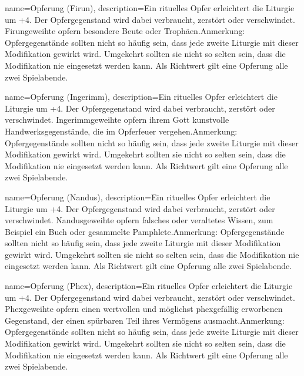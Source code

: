 {
    name={Opferung (Firun)},
    description={Ein rituelles Opfer erleichtert die Liturgie um +4. Der Opfergegenstand wird dabei verbraucht, zerstört oder verschwindet. Firungeweihte opfern besondere Beute oder Trophäen.\newline Anmerkung: Opfergegenstände sollten nicht so häufig sein, dass jede zweite Liturgie mit dieser Modifikation gewirkt wird. Umgekehrt sollten sie nicht so selten sein, dass die Modifikation nie eingesetzt werden kann. Als Richtwert gilt eine Opferung alle zwei Spielabende.}
}


{
    name={Opferung (Ingerimm)},
    description={Ein rituelles Opfer erleichtert die Liturgie um +4. Der Opfergegenstand wird dabei verbraucht, zerstört oder verschwindet. Ingerimmgeweihte opfern ihrem Gott kunstvolle Handwerksgegenstände, die im Opferfeuer vergehen.\newline Anmerkung: Opfergegenstände sollten nicht so häufig sein, dass jede zweite Liturgie mit dieser Modifikation gewirkt wird. Umgekehrt sollten sie nicht so selten sein, dass die Modifikation nie eingesetzt werden kann. Als Richtwert gilt eine Opferung alle zwei Spielabende.}
}


{
    name={Opferung (Nandus)},
    description={Ein rituelles Opfer erleichtert die Liturgie um +4. Der Opfergegenstand wird dabei verbraucht, zerstört oder verschwindet. Nandusgeweihte opfern falsches oder veraltetes Wissen, zum Beispiel ein Buch oder gesammelte Pamphlete.\newline Anmerkung: Opfergegenstände sollten nicht so häufig sein, dass jede zweite Liturgie mit dieser Modifikation gewirkt wird. Umgekehrt sollten sie nicht so selten sein, dass die Modifikation nie eingesetzt werden kann. Als Richtwert gilt eine Opferung alle zwei Spielabende.}
}


{
    name={Opferung (Phex)},
    description={Ein rituelles Opfer erleichtert die Liturgie um +4. Der Opfergegenstand wird dabei verbraucht, zerstört oder verschwindet. Phexgeweihte opfern einen wertvollen und möglichst phexgefällig erworbenen Gegenstand, der einen spürbaren Teil ihres Vermögens ausmacht.\newline Anmerkung: Opfergegenstände sollten nicht so häufig sein, dass jede zweite Liturgie mit dieser Modifikation gewirkt wird. Umgekehrt sollten sie nicht so selten sein, dass die Modifikation nie eingesetzt werden kann. Als Richtwert gilt eine Opferung alle zwei Spielabende.}
}


